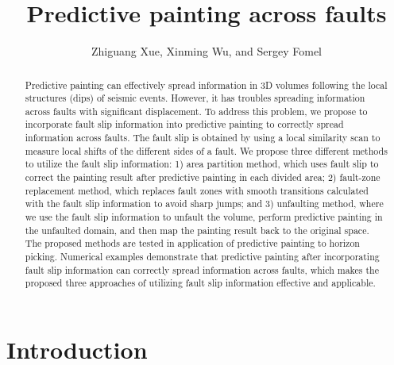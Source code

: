\title{Predictive painting across faults}
\author{Zhiguang Xue,
        Xinming Wu, and 
        Sergey Fomel }
\maketitle

\address{
Bureau of Economic Geology \\
John A. and Katherine G. Jackson School of Geosciences \\
The University of Texas at Austin \\
University Station, Box X \\
Austin, Texas, USA 
}


\begin{abstract}
	Predictive painting can effectively spread information in 3D volumes following the local structures (dips) of seismic events.
	However, it has troubles spreading information across faults with significant displacement.
	To address this problem, we propose to incorporate fault slip information into predictive painting to correctly spread information across faults.
	The fault slip is obtained by using a local similarity scan to measure local shifts of the different sides of a fault.
	We propose three different methods to utilize the fault slip information: 1) area partition method, which uses fault slip to correct the painting result after predictive painting in each divided area;
	2) fault-zone replacement method, which replaces fault zones with smooth transitions calculated with the fault slip information to avoid sharp jumps;
	and 3) unfaulting method, where we use the fault slip information to unfault the volume, perform predictive painting in the unfaulted domain, and then map the painting result back to the original space.
	The proposed methods are tested in application of predictive painting to horizon picking. 
	Numerical examples demonstrate that predictive painting after incorporating fault slip information can correctly spread information across faults, which makes the proposed three approaches of utilizing fault slip information effective and applicable.
\end{abstract}

\section{Introduction}


